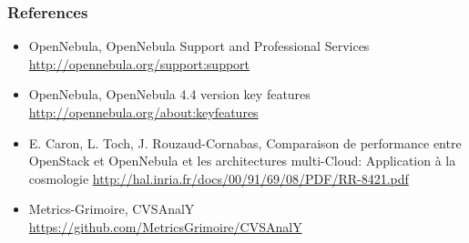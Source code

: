 \begin{frame}
\frametitle{References}


\begin{itemize}
\item OpenNebula, OpenNebula Support and Professional Services
\url{http://opennebula.org/support:support}
\item OpenNebula, OpenNebula 4.4 version key features
\url{http://opennebula.org/about:keyfeatures}
\item E. Caron, L. Toch, J. Rouzaud-Cornabas, Comparaison de performance entre OpenStack et OpenNebula et les architectures multi-Cloud: Application à la cosmologie
\url{http://hal.inria.fr/docs/00/91/69/08/PDF/RR-8421.pdf}

\item Metrics-Grimoire, CVSAnalY
\url{https://github.com/MetricsGrimoire/CVSAnalY}
\end{itemize}

\end{frame}
